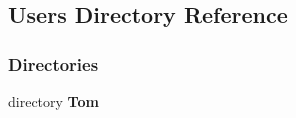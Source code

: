 \subsection{Users Directory Reference}
\label{dir_d522931ffa1371640980b621734a4381}
\subsubsection*{Directories}
\begin{DoxyCompactItemize}
\item 
directory \textbf{ Tom}
\end{DoxyCompactItemize}
